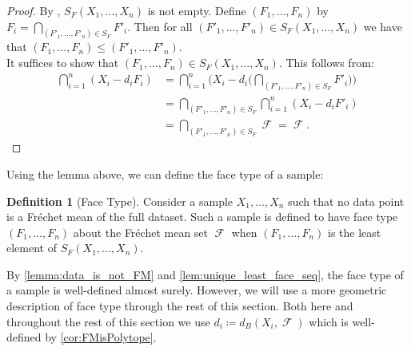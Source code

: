\documentclass[10pt]{article}
\theoremstyle{definition}
\newtheorem{definition}[theorem]{Definition}
\theoremstyle{remark}
\newcommand{\sample}{ X_1,\dots, X_n}
\DeclareMathOperator{\FMset}{\mathcal{F}}
\begin{document}
	\begin{proof}
		By , $S_F(\sample)$ is not empty. Define $(F_1, \dots, F_n)$ by $F_i = \bigcap_{(F'_1, \dots, F'_n) \in S_F} F'_i$.
		Then for all $(F'_1, \dots, F'_n) \in S_F(\sample)$ we have that $(F_1, \dots, F_n) \leq (F'_1, \dots, F'_n)$. \\
		It suffices to show that $(F_1, \dots, F_n) \in S_F(\sample)$. This follows from:
		\begin{align*}
			\textstyle \bigcap_{i = 1}^n (X_i - d_i F_i) &= \textstyle \bigcap_{i = 1}^n \bigg(X_i - d_i \big( \textstyle \bigcap_{(F'_1, \dots, F'_n) \in S_F} F'_i\big)\bigg) \\
			&= \textstyle \bigcap_{(F'_1, \dots, F'_n) \in S_F} \bigcap_{i = 1}^n (X_i - d_i F'_i) \\
			&= \textstyle \bigcap_{(F'_1, \dots, F'_n) \in S_F} \FMset = \FMset.
		\end{align*}
	\end{proof}
	Using the lemma above, we can define the face type of a sample:
	\begin{definition}[Face Type]
		Consider a sample $\sample$ such that no data point is a Fr\'echet mean of the full dataset. Such a sample is defined to have face type $(F_1, \dots, F_n)$ about the Fr\'echet mean set $\FMset$ when $(F_1, \dots, F_n)$ is the least element of $S_F(\sample)$.
	\end{definition}
	
	By \cref{lemma:data_is_not_FM} and \cref{lem:unique_least_face_seq}, the face type of a sample is well-defined almost surely. However, we will use a more geometric description of face type through the rest of this section. Both here and throughout the rest of this section we use $d_i \coloneqq d_B(X_i, \FMset)$ which is well-defined by \cref{cor:FMisPolytope}.
	
\end{document}
